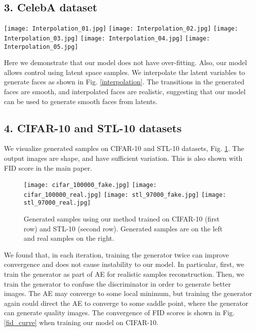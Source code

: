 \documentclass[runningheads]{llncs}
\begin{document}
\subsection*{3. CelebA dataset}

\begin{figure*}
\centering
\texttt{[image: Interpolation\_01.jpg]}
\texttt{[image: Interpolation\_02.jpg]}
\texttt{[image: Interpolation\_03.jpg]}
\texttt{[image: Interpolation\_04.jpg]}
\texttt{[image: Interpolation\_05.jpg]}
\caption{Samples generated by our method from interpolated latents.}
\label{interpolation}
\end{figure*}

Here we  demonstrate that our model does not have  over-fitting.
Also, our model allows control using latent space samples. We interpolate the latent variables to generate faces as shown in Fig. \ref{interpolation}. The transitions in the generated faces are smooth, and interpolated faces are realistic, suggesting that our model can be used  to generate smooth faces from latents.

\subsection*{4. CIFAR-10 and STL-10 datasets}

We visualize generated samples on CIFAR-10 and STL-10 datasets, Fig. \ref{cifar_generated_samples}. The output images are shape, and have sufficient variation. This is also shown with FID score in the main paper.

\begin{figure}
\centering
\texttt{[image: cifar\_100000\_fake.jpg]}
\texttt{[image: cifar\_100000\_real.jpg]}
\texttt{[image: stl\_97000\_fake.jpg]}
\texttt{[image: stl\_97000\_real.jpg]}
\caption{Generated samples using our method trained on CIFAR-10 (first row) and STL-10 (second row). Generated samples are on the left and real samples on the right.}
\label{cifar_generated_samples}
\end{figure}

We found that, in each iteration, training the generator twice can improve convergence and does not cause instability to our model. In particular, first, we train the generator as part of AE for realistic samples reconstruction. Then, we train the generator to confuse the discriminator in order to generate better images. The AE may converge to some local minimum, but training the generator again could direct the AE to converge  to some saddle point, where the generator can generate quality images. The convergence of FID scores is shown in Fig. \ref{fid_curve} when training our model on CIFAR-10.
\end{document}
